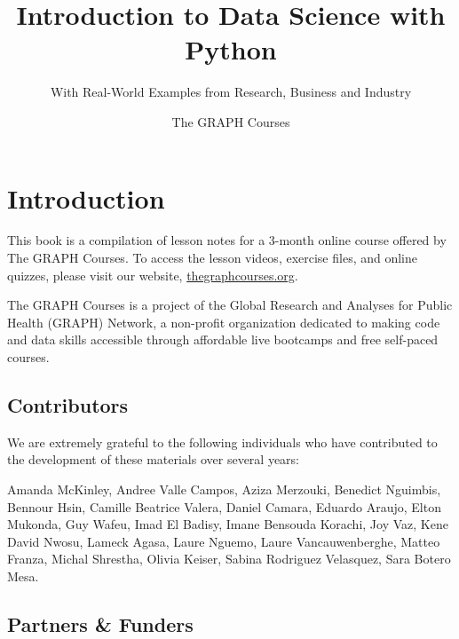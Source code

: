 \documentclass[
  letterpaper,
  DIV=11,
  numbers=noendperiod]{scrreprt}
\title{Introduction to Data Science with Python}
\subtitle{With Real-World Examples from Research, Business and Industry}
\author{The GRAPH Courses}
\date{}
\renewcommand*\contentsname{Table of contents}
\newcommand\contentsname{Table of contents}
\begin{document}
\maketitle

\pagestyle{mystyle}

\renewcommand*\contentsname{Table of contents}
{
\hypersetup{linkcolor=}
\setcounter{tocdepth}{2}
\tableofcontents
}


\chapter*{Introduction}\label{introduction}


This book is a compilation of lesson notes for a 3-month online course
offered by The GRAPH Courses. To access the lesson videos, exercise
files, and online quizzes, please visit our website,
\href{https://thegraphcourses.org}{thegraphcourses.org}.

The GRAPH Courses is a project of the Global Research and Analyses for
Public Health (GRAPH) Network, a non-profit organization dedicated to
making code and data skills accessible through affordable live bootcamps
and free self-paced courses.

\section*{Contributors}\label{contributors}


We are extremely grateful to the following individuals who have
contributed to the development of these materials over several years:

Amanda McKinley, Andree Valle Campos, Aziza Merzouki, Benedict Nguimbis,
Bennour Hsin, Camille Beatrice Valera, Daniel Camara, Eduardo Araujo,
Elton Mukonda, Guy Wafeu, Imad El Badisy, Imane Bensouda Korachi, Joy
Vaz, Kene David Nwosu, Lameck Agasa, Laure Nguemo, Laure
Vancauwenberghe, Matteo Franza, Michal Shrestha, Olivia Keiser, Sabina
Rodriguez Velasquez, Sara Botero Mesa.

\section*{Partners \& Funders}\label{partners-funders}
\end{document}

